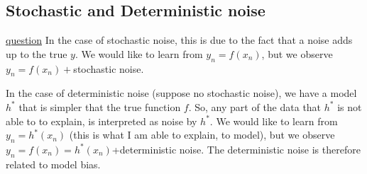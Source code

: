 \documentclass[11pt,a4paper]{article}
\theoremstyle{definition}
\begin{document}
	\subsection{Stochastic and Deterministic noise}\href{https://math.stackexchange.com/questions/2466305/deterministic-noise-and-overfit-relation-when-target-function-and-hypothesis-are}{question}
	In the case of stochastic noise, this is due to the fact that a noise adds up to the true $y$. We would like to learn from $y_n=f(x_n)$, but we observe $y_n=f(x_n)+$stochastic noise.

In the case of deterministic noise (suppose no stochastic noise), we have a model $h^*$ that is simpler that the true function $f$. So, any part of the data that $h^*$ is not able to to explain, is interpreted as noise by $h^*$. We would like to learn from $y_n=h^*(x_n)$ (this is what I am able to explain, to model), but we observe $y_n=f(x_n)=h^*(x_n)$+deterministic noise. The deterministic noise is therefore related to model bias.
\end{document}
